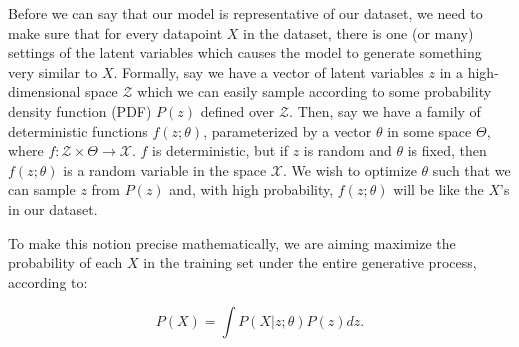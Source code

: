 \documentclass[a4paper, 11pt]{article} %
\begin{document}
Before we can say that our model is representative of our dataset, we need to make sure that for every datapoint $X$ in the dataset, there is one (or many) settings of the latent variables which causes the model to generate something very similar to $X$.  
Formally, say we have a vector of latent variables $z$ in a high-dimensional space $\mathcal{Z}$ which we can easily sample according to some probability density function (PDF) $P(z)$ defined over $\mathcal{Z}$.
Then, say we have a family of deterministic functions $f(z;\theta)$, parameterized by a vector $\theta$ in some space $\Theta$, where $f: \mathcal{Z}\times\Theta \to \mathcal{X}$.
$f$ is deterministic, but if $z$ is random and $\theta$ is fixed, then $f(z;\theta)$ is a random variable in the space $\mathcal{X}$.
We wish to optimize $\theta$ such that we can sample $z$ from $P(z)$ and, with high probability, $f(z;\theta)$ will be like the $X$'s in our dataset. 
 
To make this notion precise mathematically, we are aiming maximize the probability of each $X$ in the training set under the entire generative process, according to:

\begin{equation}
P(X)=\int P(X|z;\theta)P(z) dz.
\label{eq:total}
\end{equation}
\end{document}
